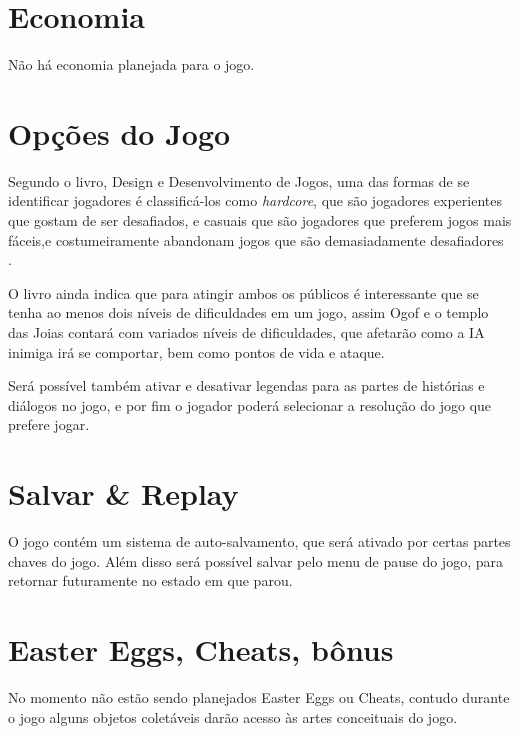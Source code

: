\section{Economia}

Não há economia planejada para o jogo.

\section{Opções do Jogo}

Segundo o livro, Design e Desenvolvimento de Jogos, uma das formas de se identificar jogadores é classificá-los como \textit{hardcore}, que são jogadores experientes que gostam de ser desafiados, e casuais que são jogadores que preferem jogos mais fáceis,e costumeiramente abandonam jogos que são demasiadamente desafiadores \cite{pradadesign}. 

O livro ainda indica que para atingir ambos os públicos é interessante que se tenha ao menos dois níveis de dificuldades em um jogo, assim Ogof e o templo das Joias contará com variados níveis de dificuldades, que afetarão como a IA inimiga irá se comportar, bem como pontos de vida e ataque.

Será possível também ativar e desativar legendas para as partes de histórias e diálogos no jogo, e por fim o jogador poderá selecionar a resolução do jogo que prefere jogar.

\section{Salvar \& Replay}

O jogo contém um sistema de auto-salvamento, que será ativado por certas partes chaves do jogo. Além disso será possível salvar pelo menu de pause do jogo, para retornar futuramente no estado em que parou.

\section{Easter Eggs, Cheats, bônus}

No momento não estão sendo planejados Easter Eggs ou Cheats, contudo durante o jogo alguns objetos coletáveis darão acesso às artes conceituais do jogo.
